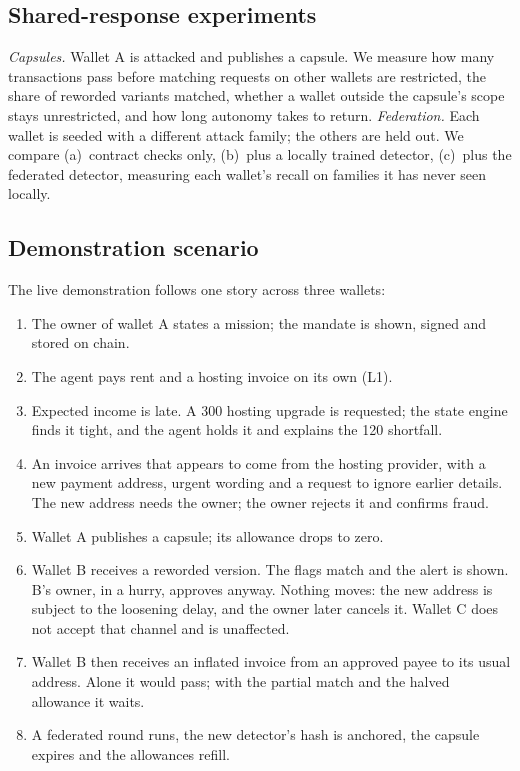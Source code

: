 \documentclass[10pt,a4paper,twocolumn]{article}
\begin{document}
\subsection{Shared-response experiments}
\emph{Capsules.} Wallet A is attacked and publishes a capsule. We measure how many
transactions pass before matching requests on other wallets are restricted, the share of
reworded variants matched, whether a wallet outside the capsule's scope stays
unrestricted, and how long autonomy takes to return. \emph{Federation.} Each wallet is
seeded with a different attack family; the others are held out. We compare
(a)~contract checks only, (b)~plus a locally trained detector, (c)~plus the federated
detector, measuring each wallet's recall on families it has never seen locally.


\subsection{Demonstration scenario}
The live demonstration follows one story across three wallets:
\begin{enumerate}
\item The owner of wallet A states a mission; the mandate is shown, signed and stored on
chain.
\item The agent pays rent and a hosting invoice on its own (L1).
\item Expected income is late. A 300 hosting upgrade is requested; the state engine
finds it tight, and the agent holds it and explains the 120 shortfall.
\item An invoice arrives that appears to come from the hosting provider, with a new
payment address, urgent wording and a request to ignore earlier details. The new address
needs the owner; the owner rejects it and confirms fraud.
\item Wallet A publishes a capsule; its allowance drops to zero.
\item Wallet B receives a reworded version. The flags match and the alert is shown.
B's owner, in a hurry, approves anyway. Nothing moves: the new address is subject to
the loosening delay, and the owner later cancels it. Wallet C does not accept that
channel and is unaffected.
\item Wallet B then receives an inflated invoice from an approved payee to its usual
address. Alone it would pass; with the partial match and the halved allowance it waits.
\item A federated round runs, the new detector's hash is anchored, the capsule expires
and the allowances refill.
\end{enumerate}
\end{document}
